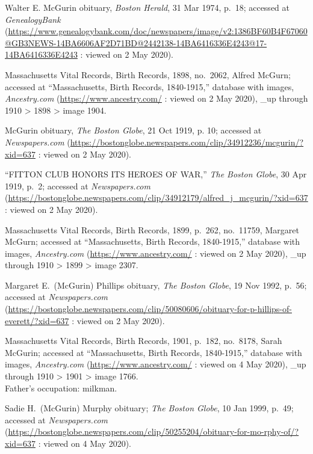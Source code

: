 \begin{thebibliography}{999}
	Walter E. McGurin obituary, \textit{Boston Herald}, 31 Mar 1974, p.\ 18; accessed at \textit{GenealogyBank} (\url{https://www.genealogybank.com/doc/newspapers/image/v2:1386BF60B4F67060@GB3NEWS-14BA6606AF2D71BD@2442138-14BA6416336E4243@17-14BA6416336E4243} : viewed on 2 May 2020).
	
	Massachusetts Vital Records, Birth Records, 1898, no.\ 2062, Alfred McGurn; accessed at ``Massachusetts, Birth Records, 1840-1915,'' database with images, \textit{Ancestry.com} (\url{https://www.ancestry.com/} : viewed on 2 May 2020), \_up through 1910 > 1898 > image 1904.
	
	McGurin obituary, \textit{The Boston Globe}, 21 Oct 1919, p. 10; accessed at \textit{Newspapers.com} (\url{https://bostonglobe.newspapers.com/clip/34912236/mcgurin/?xid=637} : viewed on 2 May 2020).	
	
	``FITTON CLUB HONORS ITS HEROES OF WAR,'' \textit{The Boston Globe}, 30 Apr 1919, p.\ 2; accessed at \textit{Newspapers.com} (\url{https://bostonglobe.newspapers.com/clip/34912179/alfred_j_mcgurin/?xid=637} : viewed on 2 May 2020).
	
	Massachusetts Vital Records, Birth Records, 1899, p.\ 262, no.\ 11759, Margaret McGurn; accessed at ``Massachusetts, Birth Records, 1840-1915,'' database with images, \textit{Ancestry.com} (\url{https://www.ancestry.com/} : viewed on 2 May 2020), \_up through 1910 > 1899 > image 2307.
	
	Margaret E.\ (McGurin) Phillips obituary, \textit{The Boston Globe}, 19 Nov 1992, p.\ 56; accessed at \textit{Newspapers.com} 
	(\url{https://bostonglobe.newspapers.com/clip/50080606/obituary-for-p-hillips-of-everett/?xid=637} : viewed on 2 May 2020).
	
	Massachusetts Vital Records, Birth Records, 1901, p.\ 182, no.\ 8178, Sarah McGurin; accessed at ``Massachusetts, Birth Records, 1840-1915,'' database with images, \textit{Ancestry.com} (\url{https://www.ancestry.com/} : viewed on 4 May 2020), \_up through 1910 > 1901 > image 1766.\\
	Father's occupation: milkman.
	
	Sadie H.\ (McGurin) Murphy obituary; \textit{The Boston Globe}, 10 Jan 1999, p.\ 49; accessed at \textit{Newspapers.com} (\url{https://bostonglobe.newspapers.com/clip/50255204/obituary-for-mo-rphy-of/?xid=637} : viewed on 4 May 2020).
	

\end{thebibliography}
